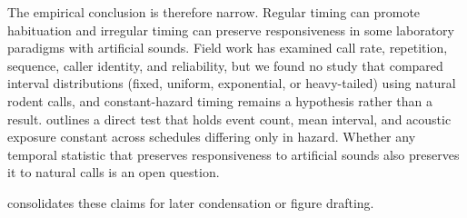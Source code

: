 The empirical conclusion is therefore narrow. Regular timing can promote habituation and irregular timing can preserve responsiveness in some laboratory paradigms with artificial sounds. Field work has examined call rate, repetition, sequence, caller identity, and reliability, but we found no study that compared interval distributions (fixed, uniform, exponential, or heavy-tailed) using natural rodent calls, and constant-hazard timing remains a hypothesis rather than a result.  outlines a direct test that holds event count, mean interval, and acoustic exposure constant across schedules differing only in hazard. Whether any temporal statistic that preserves responsiveness to artificial sounds also preserves it to natural calls is an open question.

 consolidates these claims for later condensation or figure drafting.


